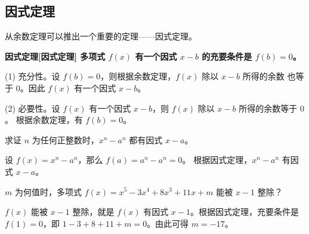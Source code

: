 \subsection{因式定理}\label{subsec:1-4}

从余数定理可以推出一个重要的定理——因式定理。

\textbf{因式定理[因式定理] \quad 多项式 $f(x)$ 有一个因式 $x -b$ 的充要条件是 $f(b) = 0$。}

\zhengming (1) 充分性。设 $f(b) = 0$，则根据余数定理，$f(x)$ 除以 $x - b$ 所得的余数
也等于 $0$。因此 $f(x)$ 有一个因式 $x - b$。

(2) 必要性。设 $f(x)$ 有一个因式 $x - b$，则 $f(x)$ 除以 $x - b$ 所得的余数等于 $0$。
根据余数定理，有 $f(b) = 0$。


\liti 求证 $n$ 为任何正整数时，$x^n - a^n$ 都有因式 $x - a$。

\zhengming 设 $f(x) = x^n - a^n$，那么 $f(a) = a^n - a^n = 0$。
根据因式定理，$x^n - a^n$ 有因式 $x - a$。


\liti $m$ 为何值时，多项式 $f(x) = x^5 -3x^4 + 8x^3 + 11x + m$ 能被 $x - 1$ 整除？

\jie $f(x)$ 能被 $x - 1$ 整除，就是 $f(x)$ 有因式 $x - 1$。根据因式定理，充要条件是
$f(1) = 0$，即 $1 - 3 + 8 + 11 + m = 0$。由此可得 $m = -17$。


\lianxi
\begin{xiaotis}





\end{xiaotis}

